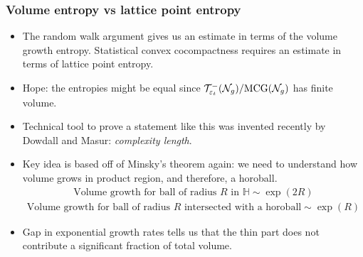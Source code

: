 \begin{frame}
  \frametitle{Volume entropy vs lattice point entropy}
  \begin{itemize}
  \item<2-> The random walk argument gives us an estimate in terms of the volume growth entropy. Statistical convex cocompactness requires an estimate in terms of lattice point entropy.
  \item<3-> Hope: the entropies might be equal since $\mathcal{T}_{\varepsilon_t}^{-}(\mathcal{N}_g)/\text{MCG}(\mathcal{N}_g)$ has finite volume.
  \item<4-> Technical tool to prove a statement like this was invented recently by Dowdall and Masur: \emph{complexity length}.
  \item<5-> Key idea is based off of Minsky's theorem again: we need to understand how volume grows in product region, and therefore, a horoball.
     {
      \begin{align*}
        \text{Volume growth for ball of radius $R$ in $\mathbb{H}$} \sim \exp(2R)
      \end{align*}
    }
     {
      \begin{align*}
        \text{Volume growth for ball of radius $R$ intersected with a horoball}  \sim \exp(R)
      \end{align*}
    }
  \item<8-> Gap in exponential growth rates tells us that the thin part does not contribute a significant fraction of total volume.
  \end{itemize}
\end{frame}

